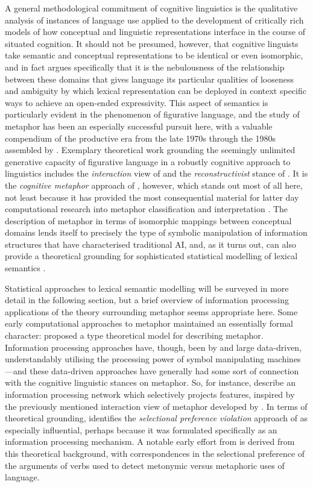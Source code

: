 A general methodological commitment of cognitive linguistics is the qualitative analysis of instances of language use applied to the development of critically rich models of how conceptual and linguistic representations interface in the course of situated cognition.  It should not be presumed, however, that cognitive linguists take semantic and conceptual representations to be identical or even isomorphic, and in fact \cite{Evans2009} argues specifically that it is the nebulousness of the relationship between these domains that gives language its particular qualities of looseness and ambiguity by which lexical representation can be deployed in context specific ways to achieve an open-ended expressivity.  This aspect of semantics is particularly evident in the phenomenon of figurative language, and the study of metaphor has been an especially successful pursuit here, with a valuable compendium of the productive era from the late 1970s through the 1980s assembled by \cite{Ortony1993}.  Exemplary theoretical work grounding the seemingly unlimited generative capacity of figurative language in a robustly cognitive approach to linguistics includes the \emph{interaction} view of \cite{Black1955,Black1977} and the \emph{reconstructivist} stance of \cite{Ortony1975}.  It is the \emph{cognitive metaphor} approach of \cite{LakoffEA1980}, however, which stands out most of all here, not least because it has provided the most consequential material for latter day computational research into metaphor classification and interpretation \citep{Shutova2015}.  The description of metaphor in terms of isomorphic mappings between conceptual domains lends itself to precisely the type of symbolic manipulation of information structures that have characterised traditional AI, and, as it turns out, can also provide a theoretical grounding for sophisticated statistical modelling of lexical semantics \citep{ShutovaEA2013}.

Statistical approaches to lexical semantic modelling will be surveyed in more detail in the following section, but a brief overview of information processing applications of the theory surrounding metaphor seems appropriate here.  Some early computational approaches to metaphor maintained an essentially formal character: \cite{vanGenabith2001} proposed a type theoretical model for describing metaphor.  Information processing approaches have, though, been by and large data-driven, understandably utilising the processing power of symbol manipulating machines---and these data-driven approaches have generally had some sort of connection with the cognitive linguistic stances on metaphor.  So, for instance, \cite{ThomasEA1999} describe an information processing network which selectively projects features, inspired by the previously mentioned interaction view of metaphor developed by \cite{Black1977}.  In terms of theoretical grounding, \cite{Shutova2010} identifies the \emph{selectional preference violation} approach of \cite{Wilks1978} as especially influential, perhaps because it was formulated specifically as an information processing mechanism.  A notable early effort from \cite{Fass1991} is derived from this theoretical background, with correspondences in the selectional preference of the arguments of verbs used to detect metonymic versus metaphoric uses of language.

